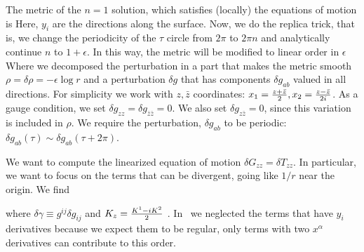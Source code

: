The metric of the $n=1$ solution, which satisfies (locally) the equations of motion is
\eqn{}
Here,   $y_i$ are the directions along the surface. Now, we do the replica trick, that is, we change the periodicity of the $\tau$ circle from $2\pi$ to $2\pi n$ and analytically continue $n$ to $1+\epsilon$. In this way, the metric will be modified to linear order in $\epsilon$
\eqn{}
Where we decomposed the perturbation in a part that makes the metric smooth
$\rho = \delta \rho = - \epsilon \log r  $  and a perturbation $\delta g$  that has components $\delta g_{a b}$ valued in all directions. For simplicity we work with $z, \bar{z}$ coordinates: $x_1={ z+\bar{z} \over 2},x_2={z-\bar{z} \over 2 i}$.
As a gauge condition, we  set $\delta g_{z z}=\delta g_{\bar{z} \bar{z}}=0$.
 We also set $\delta g_{z \bar z} =0$, since this variation is included in $\rho$.  We require the  perturbation, $\delta g_{a b}$ to be periodic: $\delta g_{a b}(\tau) \sim \delta g_{a b}(\tau+2\pi)$.


We want to compute the linearized equation of motion $\delta G_{zz} = \delta T_{zz}$.
In particular, we want to focus on the terms that can be divergent, going like $1/r$ near the origin.
 We find

\eqn{}
where $\delta \gamma \equiv g^{i j} \delta g_{i j}$ and $K_z={K^1-i K^2 \over 2}$ .
In \flucEin\ we neglected the terms that have $y_i$ derivatives because we expect them to be regular, only terms
 with two $x^\alpha$ derivatives can contribute to this order.

